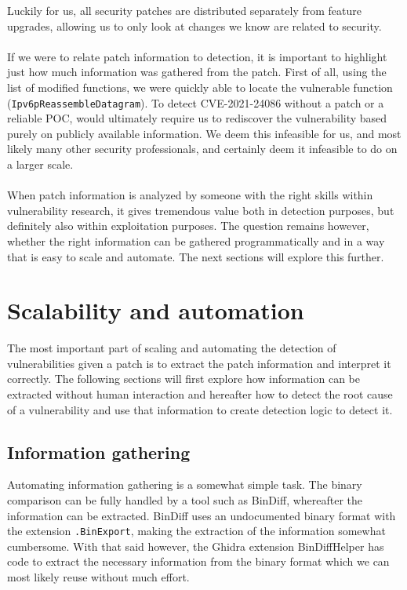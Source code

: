 \documentclass{report}
\begin{document}
Luckily for us, all security patches are distributed separately from feature upgrades, allowing us to only look at changes we know are related to security.
\\
\\
If we were to relate patch information to detection, it is important to highlight just how much information was gathered from the patch. First of all, using the list of modified functions, we were quickly able to locate the vulnerable function (\texttt{Ipv6pReassembleDatagram}). To detect CVE-2021-24086 without a patch or a reliable \gls{POC}, would ultimately require us to rediscover the vulnerability based purely on publicly available information. We deem this infeasible for us, and most likely many other security professionals, and certainly deem it infeasible to do on a larger scale.
\\
\\
When patch information is analyzed by someone with the right skills within vulnerability research, it gives tremendous value both in detection purposes, but definitely also within exploitation purposes. The question remains however, whether the right information can be gathered programmatically and in a way that is easy to scale and automate. The next sections will explore this further.

\section{Scalability and automation}
The most important part of scaling and automating the detection of vulnerabilities given a patch is to extract the patch information and interpret it correctly. The following sections will first explore how information can be extracted without human interaction and hereafter how to detect the root cause of a vulnerability and use that information to create detection logic to detect it.

\subsection{Information gathering}
Automating information gathering is a somewhat simple task. The binary comparison can be fully handled by a tool such as BinDiff\cite{url:bindiff:homepage}, whereafter the information can be extracted. BinDiff uses an undocumented binary format with the extension \texttt{.BinExport}, making the extraction of the information somewhat cumbersome. With that said however, the Ghidra\cite{url:ghidra:homepage} extension BinDiffHelper\cite{url:BinDiffHelper:homepage} has code to extract the necessary information from the binary format which we can most likely reuse without much effort.
\end{document}
